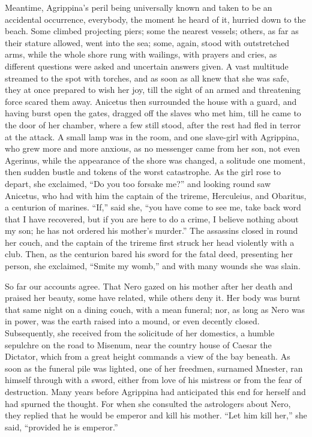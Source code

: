 
Meantime, Agrippina's peril being universally known and taken to be an accidental occurrence, everybody, the moment he heard of it, hurried down to the beach. Some climbed projecting piers; some the nearest vessels; others, as far as their stature allowed, went into the sea; some, again, stood with outstretched arms, while the whole shore rung with wailings, with prayers and cries, as different questions were asked and uncertain answers given. A vast multitude streamed to the spot with torches, and as soon as all knew that she was safe, they at once prepared to wish her joy, till the sight of an armed and threatening force scared them away. Anicetus then surrounded the house with a guard, and having burst open the gates, dragged off the slaves who met him, till he came to the door of her chamber, where a few still stood, after the rest had fled in terror at the attack. A small lamp was in the room, and one slave-girl with Agrippina, who grew more and more anxious, as no messenger came from her son, not even Agerinus, while the appearance of the shore was changed, a solitude one moment, then sudden bustle and tokens of the worst catastrophe. As the girl rose to depart, she exclaimed, ``Do you too forsake me?'' and looking round saw Anicetus, who had with him the captain of the trireme, Herculeius, and Obaritus, a centurion of marines. ``If,'' said she, ``you have come to see me, take back word that I have recovered, but if you are here to do a crime, I believe nothing about my son; he has not ordered his mother's murder.'' The assassins closed in round her couch, and the captain of the trireme first struck her head violently with a club. Then, as the centurion bared his sword for the fatal deed, presenting her person, she exclaimed, ``Smite my womb,'' and with many wounds she was slain.


So far our accounts agree. That Nero gazed on his mother after her death and praised her beauty, some have related, while others deny it. Her body was burnt that same night on a dining couch, with a mean funeral; nor, as long as Nero was in power, was the earth raised into a mound, or even decently closed. Subsequently, she received from the solicitude of her domestics, a humble sepulchre on the road to Misenum, near the country house of Caesar the Dictator, which from a great height commands a view of the bay beneath. As soon as the funeral pile was lighted, one of her freedmen, surnamed Mnester, ran himself through with a sword, either from love of his mistress or from the fear of destruction. Many years before Agrippina had anticipated this end for herself and had spurned the thought. For when she consulted the astrologers about Nero, they replied that he would be emperor and kill his mother. ``Let him kill her,'' she said, ``provided he is emperor.''

